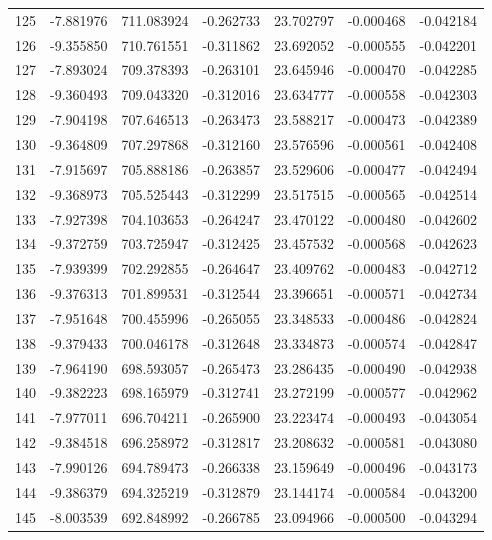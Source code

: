 \begin{tabular}{rrrrrrr}
 125 &  -7.881976 &  711.083924 & -0.262733 &   23.702797 &   -0.000468 & -0.042184 \\
 126 &  -9.355850 &  710.761551 & -0.311862 &   23.692052 &   -0.000555 & -0.042201 \\
 127 &  -7.893024 &  709.378393 & -0.263101 &   23.645946 &   -0.000470 & -0.042285 \\
 128 &  -9.360493 &  709.043320 & -0.312016 &   23.634777 &   -0.000558 & -0.042303 \\
 129 &  -7.904198 &  707.646513 & -0.263473 &   23.588217 &   -0.000473 & -0.042389 \\
 130 &  -9.364809 &  707.297868 & -0.312160 &   23.576596 &   -0.000561 & -0.042408 \\
 131 &  -7.915697 &  705.888186 & -0.263857 &   23.529606 &   -0.000477 & -0.042494 \\
 132 &  -9.368973 &  705.525443 & -0.312299 &   23.517515 &   -0.000565 & -0.042514 \\
 133 &  -7.927398 &  704.103653 & -0.264247 &   23.470122 &   -0.000480 & -0.042602 \\
 134 &  -9.372759 &  703.725947 & -0.312425 &   23.457532 &   -0.000568 & -0.042623 \\
 135 &  -7.939399 &  702.292855 & -0.264647 &   23.409762 &   -0.000483 & -0.042712 \\
 136 &  -9.376313 &  701.899531 & -0.312544 &   23.396651 &   -0.000571 & -0.042734 \\
 137 &  -7.951648 &  700.455996 & -0.265055 &   23.348533 &   -0.000486 & -0.042824 \\
 138 &  -9.379433 &  700.046178 & -0.312648 &   23.334873 &   -0.000574 & -0.042847 \\
 139 &  -7.964190 &  698.593057 & -0.265473 &   23.286435 &   -0.000490 & -0.042938 \\
 140 &  -9.382223 &  698.165979 & -0.312741 &   23.272199 &   -0.000577 & -0.042962 \\
 141 &  -7.977011 &  696.704211 & -0.265900 &   23.223474 &   -0.000493 & -0.043054 \\
 142 &  -9.384518 &  696.258972 & -0.312817 &   23.208632 &   -0.000581 & -0.043080 \\
 143 &  -7.990126 &  694.789473 & -0.266338 &   23.159649 &   -0.000496 & -0.043173 \\
 144 &  -9.386379 &  694.325219 & -0.312879 &   23.144174 &   -0.000584 & -0.043200 \\
 145 &  -8.003539 &  692.848992 & -0.266785 &   23.094966 &   -0.000500 & -0.043294 \\

\end{tabular}
